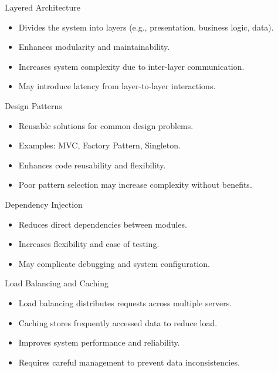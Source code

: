 \documentclass[aspectratio=169, table]{beamer}
\begin{document}
	\begin{frame}{Layered Architecture}
		\begin{itemize}
			\item Divides the system into layers (e.g., presentation, business logic, data).
			\item Enhances modularity and maintainability.
			\item Increases system complexity due to inter-layer communication.
			\item May introduce latency from layer-to-layer interactions.
		\end{itemize}
	\end{frame}
	
	\begin{frame}{Design Patterns}
		\begin{itemize}
			\item Reusable solutions for common design problems.
			\item Examples: MVC, Factory Pattern, Singleton.
			\item Enhances code reusability and flexibility.
			\item Poor pattern selection may increase complexity without benefits.
		\end{itemize}
	\end{frame}
	
	\begin{frame}{Dependency Injection}
		\begin{itemize}
			\item Reduces direct dependencies between modules.
			\item Increases flexibility and ease of testing.
			\item May complicate debugging and system configuration.
		\end{itemize}
	\end{frame}
	
	\begin{frame}{Load Balancing and Caching}
		\begin{itemize}
			\item Load balancing distributes requests across multiple servers.
			\item Caching stores frequently accessed data to reduce load.
			\item Improves system performance and reliability.
			\item Requires careful management to prevent data inconsistencies.
		\end{itemize}
	\end{frame}
	
\end{document}
